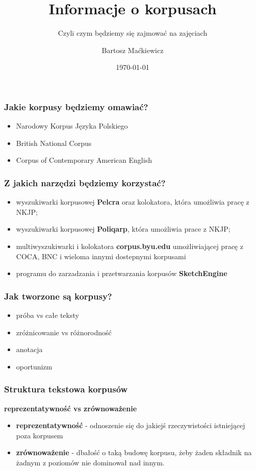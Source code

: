 \documentclass{beamer}
\title{Informacje o korpusach}
\subtitle{Czyli czym będziemy się zajmować na zajęciach}
\date{\today}
\author{Bartosz Maćkiewicz}
\institute{Instytut Filozofii, Uniwersytet Warszawski}
\begin{document}
\maketitle

\begin{frame}
  \frametitle{Jakie korpusy będziemy omawiać?}
  \Large
  \begin{itemize}
  \item Narodowy Korpus Języka Polskiego
  \item British National Corpus
  \item Corpus of Contemporary American English
  \end{itemize}
\end{frame}

\begin{frame}
  \frametitle{Z jakich narzędzi będziemy korzystać?}
  \Large
  \begin{itemize}
  \item wyszukiwarki korpusowej \textbf{Pelcra} oraz kolokatora, która umożliwia pracę z NKJP;
  \item wyszukiwarki korpusowej \textbf{Poliqarp}, która umożliwia prace z NKJP;
  \item multiwyszukiwarki i kolokatora \textbf{corpus.byu.edu} umożliwiającej pracę z COCA, BNC i wieloma innymi dostepnymi korpusami
  \item programu do zarzadzania i przetwarzania korpusów \textbf{SketchEngine}
  \end{itemize}
\end{frame}

\begin{frame}
  \Large
  \frametitle{Jak tworzone są korpusy?}
  \begin{itemize}
  \item próba vs całe teksty
  \item zróżnicowanie vs różnorodność
  \item anotacja
  \item oportunizm
  \end{itemize}
\end{frame}

\begin{frame}
  \Large
  \frametitle{Struktura tekstowa korpusów}
  \textbf{reprezentatywność vs zrównoważenie}
  \begin{itemize}
   \item \textbf{reprezentatywność} - odnoszenie się do jakiejś rzeczywistości istniejącej poza korpusem
   \item \textbf{zrównoważenie} - dbałość o taką budowę korpusu, żeby żaden składnik na żadnym z poziomów nie dominował nad innym.
  \end{itemize}
\end{frame}
\end{document}
